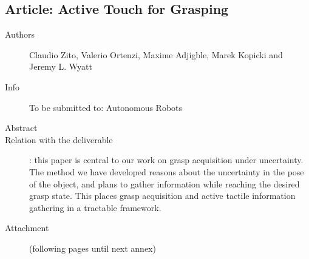 \documentclass[a4paper,11pt,pdf]{pacmanreport}
\begin{document}
\subsection{Article: Active Touch for Grasping}
\label{ann:activetouch}
\begin{description}
    \item[Authors] Claudio Zito, Valerio Ortenzi, Maxime Adjigble, Marek Kopicki and Jeremy L. Wyatt
    \item[Info] To be submitted to: Autonomous Robots
    \item[Abstract]  
    \item[Relation with the deliverable]: this paper is central to our work on grasp acquisition under uncertainty. The method we have developed reasons about the uncertainty in the pose of the object, and plans to gather information while reaching the desired grasp state. This places grasp acquisition and active tactile information gathering in a tractable framework.
    \item[Attachment] (following pages until next annex)
\end{description}
%
\end{document}
